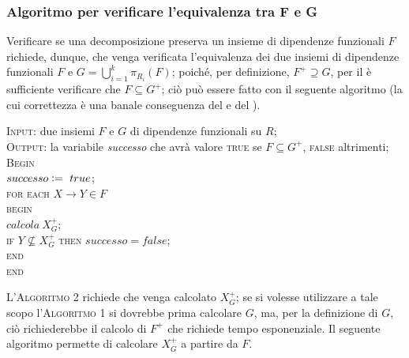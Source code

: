 \subsubsection{Algoritmo per verificare l'equivalenza tra F e G}
Verificare se una decomposizione preserva un insieme di dipendenze funzionali $F$ richiede, dunque,
che venga verificata l'equivalenza dei due insiemi di dipendenze funzionali $F$ e $G = \bigcup_{i=1}^k
\pi_{R_i}(F)$; poiché, per definizione, $F^+ \supseteq G$, per il  è sufficiente
verificare che $F\subseteq G^+$; ciò può essere fatto con il seguente algoritmo (la cui correttezza è una 
banale conseguenza del  e del ).

\begin{alg}
\textsc{Input:} due insiemi $F$ e $G$ di dipendenze funzionali su $R$;\\
\textsc{Output:} la variabile \emph{successo} che avrà valore \textsc{true} se $F\subseteq G^+$, \textsc{false}
altrimenti;\\
\textsc{Begin}\\
$successo\vcentcolon=\ true$;\\
\textsc{for each} $X \rightarrow Y \in F$\\
\indent \textsc{begin}\\
\indent $calcola\ X_{G}^+$;\\
\indent \textsc{if} $Y \not\subseteq X^+_G$ \textsc{then} $successo=false$;\\
\indent \textsc{end}\\
\textsc{end}\\
\end{alg}

\noindent L'\textsc{Algoritmo 2} richiede che venga calcolato $X^{+}_G$; se si volesse utilizzare a tale scopo l'\textsc{Algoritmo 1}
si dovrebbe prima calcolare $G$, ma, per la definizione di $G$, ciò richiederebbe il calcolo di $F^+$ che
richiede tempo esponenziale. Il seguente algoritmo permette di calcolare $X^{+}_G$ a partire da $F$.

